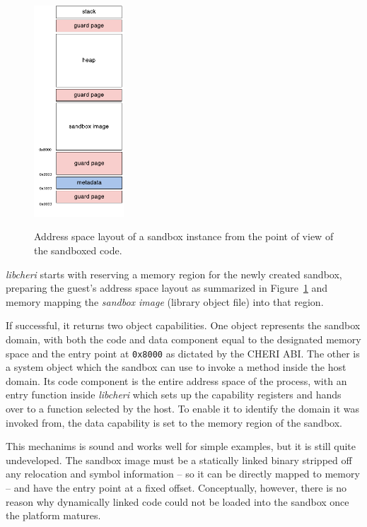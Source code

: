 \documentclass[a4paper,12pt,twoside,openright]{report}
\newcommand{\tool}[1]{\emph{#1}}
\newcommand{\lib}[1]{\tool{lib#1}}
\begin{document}
\begin{figure}
	\centering
	\includegraphics[width=0.3\textwidth]{dia_address_layout.pdf}
	\label{fig:AddressSpaceLayout}
	\caption{Address space layout of a sandbox instance from the point of view of the sandboxed code.}
\end{figure}

\lib{cheri} starts with reserving a memory region for the newly created sandbox, preparing the guest's address space layout as summarized in Figure~\ref{fig:AddressSpaceLayout} and memory mapping the \emph{sandbox image} (library object file) into that region. \label{sec:AddressSpaceLayout}

If successful, it returns two object capabilities. One object represents the sandbox domain, with both the code and data component equal to the designated memory space and the entry point at \texttt{0x8000} as dictated by the CHERI ABI. \label{sec:SystemObject} The other is a system object which the sandbox can use to invoke a method inside the host domain. Its code component is the entire address space of the process, with an entry function inside \lib{cheri} which sets up the capability registers and hands over to a function selected by the host. To enable it to identify the domain it was invoked from, the data capability is set to the memory region of the sandbox. 

This mechanims is sound and works well for simple examples, but it is still quite undeveloped. The sandbox image must be a statically linked binary stripped off any relocation and symbol information -- so it can be directly mapped to memory -- and have the entry point at a fixed offset. Conceptually, however, there is no reason why dynamically linked code could not be loaded into the sandbox once the platform matures.
\end{document}
